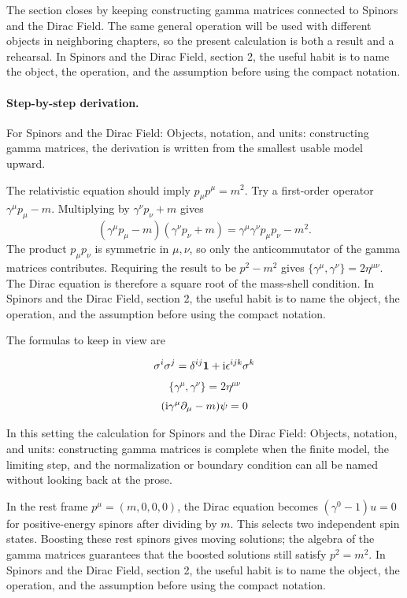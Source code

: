 The section closes by keeping constructing gamma matrices connected to Spinors and the Dirac Field.  The same general operation will be used with different objects in neighboring chapters, so the present calculation is both a result and a rehearsal.  In Spinors and the Dirac Field, section 2, the useful habit is to name the object, the operation, and the assumption before using the compact notation.



\paragraph{Step-by-step derivation.}

For Spinors and the Dirac Field: Objects, notation, and units: constructing gamma matrices, the derivation is written from the smallest usable model upward.

The relativistic equation should imply \(p_\mu p^\mu=m^2\).  Try a first-order operator \(\gamma^\mu p_\mu-m\).  Multiplying by \(\gamma^\nu p_\nu+m\) gives
\[
  (\gamma^\mu p_\mu-m)(\gamma^\nu p_\nu+m)
  =
  \gamma^\mu\gamma^\nu p_\mu p_\nu-m^2.
\]
The product \(p_\mu p_\nu\) is symmetric in \(\mu,\nu\), so only the anticommutator of the gamma matrices contributes.  Requiring the result to be \(p^2-m^2\) gives \(\{\gamma^\mu,\gamma^\nu\}=2\eta^{\mu\nu}\).  The Dirac equation is therefore a square root of the mass-shell condition.  In Spinors and the Dirac Field, section 2, the useful habit is to name the object, the operation, and the assumption before using the compact notation.

The formulas to keep in view are

\[
  \sigma^i\sigma^j=\delta^{ij}\mathbf 1+\mathrm i\epsilon^{ijk}\sigma^k
\]
\[
  \{\gamma^\mu,\gamma^\nu\}=2\eta^{\mu\nu}
\]
\[
  (\mathrm i\gamma^\mu\partial_\mu-m)\psi=0
\]

In this setting the calculation for Spinors and the Dirac Field: Objects, notation, and units: constructing gamma matrices is complete when the finite model, the limiting step, and the normalization or boundary condition can all be named without looking back at the prose.




\begin{example}
In the rest frame \(p^\mu=(m,0,0,0)\), the Dirac equation becomes \((\gamma^0-1)u=0\) for positive-energy spinors after dividing by \(m\).  This selects two independent spin states.  Boosting these rest spinors gives moving solutions; the algebra of the gamma matrices guarantees that the boosted solutions still satisfy \(p^2=m^2\).  In Spinors and the Dirac Field, section 2, the useful habit is to name the object, the operation, and the assumption before using the compact notation.
\end{example}



